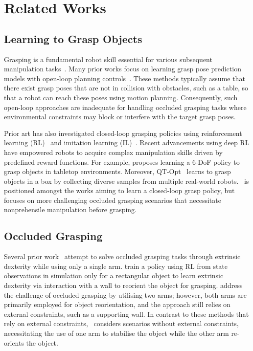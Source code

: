 \section{Related Works}

\subsection{Learning to Grasp Objects}
Grasping is a fundamental robot skill essential for various subsequent manipulation tasks~\cite{yamada2023efficient, collins2023ramp, yuan2023m2t2}.
Many prior works focus on learning grasp pose prediction models with open-loop planning controls~\cite{yuan2023m2t2, mousavian20196, barad2024graspldm}.
These methods typically assume that there exist grasp poses that are not in collision with obstacles, such as a table, so that a robot can reach these poses using motion planning.
Consequently, such open-loop approaches are inadequate for handling occluded grasping tasks where environmental constraints may block or interfere with the target grasp poses.

Prior art has also investigated closed-loop grasping policies using reinforcement learning (RL)~\cite{kalashnikov2018scalable, wang2022goal} and imitation learning (IL)~\cite{zhou2023nerf, Song2019GraspingIT}.
Recent advancements using deep RL have empowered robots to acquire complex manipulation skills driven by predefined reward functions.
For example, \citet{wang2022goal} proposes learning a 6-DoF policy to grasp objects in tabletop environments.
Moreover, QT-Opt~\cite{kalashnikov2018scalable} learns to grasp objects in a box by collecting diverse samples from multiple real-world robots.
\ourmethod~is positioned amongst the works aiming to learn a closed-loop grasp policy, but focuses on more challenging occluded grasping scenarios that necessitate nonprehensile manipulation before grasping.



\subsection{Occluded Grasping}
Several prior work~\cite{sun2020learning, zhou2023learning} attempt to solve occluded grasping tasks through extrinsic dexterity while using only a single arm.
\citet{zhou2023learning} train a policy using RL from state observations in simulation only for a rectangular object to learn extrinsic dexterity via interaction with a wall to reorient the object for grasping.
\citet{sun2020learning} address the challenge of occluded grasping by utilising two arms; however, both arms are primarily employed for object reorientation, and the approach still relies on external constraints, such as a supporting wall.
In contrast to these methods that rely on external constraints, \ourmethod~considers scenarios without external constraints, necessitating the use of one arm to stabilise the object while the other arm re-orients the object.



